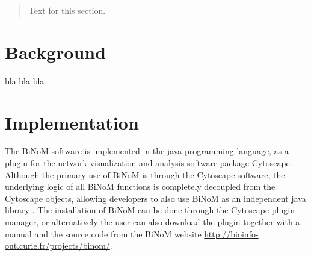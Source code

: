 \documentclass[10pt]{bmc_article}
\newenvironment{bmcformat}{\baselineskip20pt\sloppy\setboolean{publ}{false}}{\baselineskip20pt\sloppy}
\begin{document}
\begin{bmcformat}
\begin{abstract}
Text for this section.        
\end{abstract}











\section*{Background}
bla bla bla


\section*{Implementation}
The BiNoM software is implemented in the java programming language, as a plugin
for the network visualization and analysis software package Cytoscape
\cite{cline2007integration}. Although the primary use of BiNoM is through the
Cytoscape software, the underlying logic of all BiNoM functions is completely
decoupled from the Cytoscape objects, allowing developers to also use BiNoM as
an independent java library \cite{zinovyev2008binom}. The installation of BiNoM
can be done through the Cytoscape plugin manager, or alternatively the user can
also download
the plugin together with a manual and the source code from the BiNoM website
\url{http://bioinfo-out.curie.fr/projects/binom/}.


\end{bmcformat}
\end{document}

